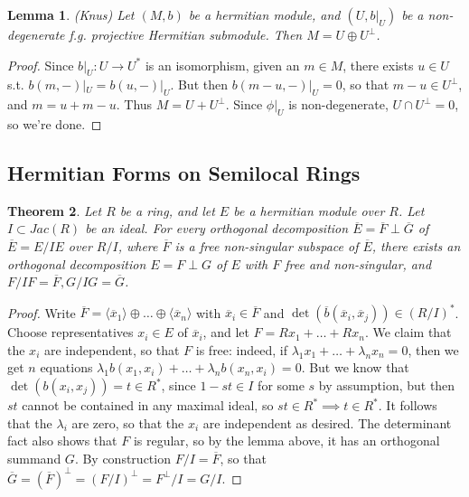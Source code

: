 \documentclass[draftthesis,tocnosub,noragright,centerchapter,10pt]{uiucthesis2009}
\theoremstyle{plain}
\newtheorem{lemma}{Lemma}
\newtheorem{theorem}[lemma]{Theorem}
\theoremstyle{definition}
\begin{document}
\begin{lemma} (Knus)
Let $(M,b)$ be a hermitian module, and $(U,b|_U)$ be a non-degenerate
f.g. projective Hermitian submodule. Then $M = U \oplus U^\perp$.
\end{lemma}

\begin{proof}
Since $b|_U : U \rightarrow U^*$ is an isomorphism, given an $m \in
M$, there exists $u \in U$ s.t. $b(m,-)|_U = b(u,-)|_U$. But then
$b(m-u,-)|_U = 0$, so that $m-u \in U^\perp$, and $m = u + m-u$. Thus
$M = U + U^\perp$. Since $\phi|_U$ is non-degenerate, $U \cap U^\perp
= 0$, so we're done. 
\end{proof}

\subsection{Hermitian Forms on Semilocal Rings}

\begin{theorem}
Let $R$ be a ring, and let $E$ be a hermitian module over
$R$. Let $I \subset Jac(R)$ be an ideal. For every orthogonal decomposition $\overline E = \overline F
\perp \overline G$ of $\overline E = E/IE$ over $R/I$, where $\overline
F$ is a free non-singular subspace of $\overline E$, there exists an
orthogonal decomposition $E = F \perp G$ of $E$ with $F$ free and
non-singular, and $F/IF = \overline F, G/IG = \overline G$.
\end{theorem}

\begin{proof}
Write $\overline F = \langle \overline x_1 \rangle \oplus \dots \oplus
\langle \overline x_n \rangle$ with $\overline x_i \in \overline F$
and $\det(\overline b(\overline x_i,\overline x_j)) \in (R/I)^*$. Choose
representatives $x_i \in E$ of $\overline x_i$, and let $F = Rx_1 +
\dots + Rx_n$. We claim that the $x_i$ are independent, so that $F$ is
free: indeed, if $\lambda_1x_1 + \dots + \lambda_nx_n = 0$, then we
get $n$ equations $\lambda_1b(x_1,x_i) + \dots + \lambda_nb(x_n,x_i) =
0$. But we know that $\det(b(x_i,x_j)) = t\in R^*$, since $1-st \in I$
for some $s$ by assumption, but then $st$ cannot be contained in any
maximal ideal, so $st \in R^*
\implies t \in R^*$. It follows that the $\lambda_i$ are zero, so that
the $x_i$ are independent as desired. The determinant fact also shows
that $F$ is regular, so by the lemma above, it has an orthogonal
summand $G$. By construction $F/I = \overline F$, so that $\overline G
= (\overline
F)^{\perp} = (F/I)^{\perp} = F^{\perp}/I = G/I$.
\end{proof}
\end{document}
